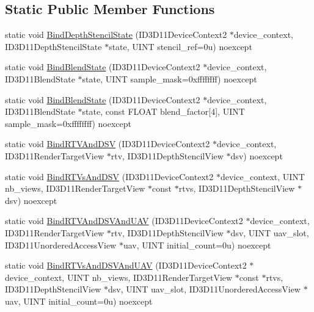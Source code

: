 \subsection*{Static Public Member Functions}
\begin{DoxyCompactItemize}
\item 
static void \hyperlink{structmage_1_1_o_m_a14f6a3fcf0678bf2092d443b06b3a925}{Bind\+Depth\+Stencil\+State} (I\+D3\+D11\+Device\+Context2 $\ast$device\+\_\+context, I\+D3\+D11\+Depth\+Stencil\+State $\ast$state, U\+I\+NT stencil\+\_\+ref=0u) noexcept
\item 
static void \hyperlink{structmage_1_1_o_m_aa0ab164522c95b983254718a17f8304e}{Bind\+Blend\+State} (I\+D3\+D11\+Device\+Context2 $\ast$device\+\_\+context, I\+D3\+D11\+Blend\+State $\ast$state, U\+I\+NT sample\+\_\+mask=0xffffffff) noexcept
\item 
static void \hyperlink{structmage_1_1_o_m_a1d28a8b67f3760107cfc4e8ae7fe78fa}{Bind\+Blend\+State} (I\+D3\+D11\+Device\+Context2 $\ast$device\+\_\+context, I\+D3\+D11\+Blend\+State $\ast$state, const F\+L\+O\+AT blend\+\_\+factor\mbox{[}4\mbox{]}, U\+I\+NT sample\+\_\+mask=0xffffffff) noexcept
\item 
static void \hyperlink{structmage_1_1_o_m_a6c031fe0e62dfee63463f05e3fb63f97}{Bind\+R\+T\+V\+And\+D\+SV} (I\+D3\+D11\+Device\+Context2 $\ast$device\+\_\+context, I\+D3\+D11\+Render\+Target\+View $\ast$rtv, I\+D3\+D11\+Depth\+Stencil\+View $\ast$dsv) noexcept
\item 
static void \hyperlink{structmage_1_1_o_m_ab296a9a3c4355437c8ef1008b2938112}{Bind\+R\+T\+Vs\+And\+D\+SV} (I\+D3\+D11\+Device\+Context2 $\ast$device\+\_\+context, U\+I\+NT nb\+\_\+views, I\+D3\+D11\+Render\+Target\+View $\ast$const $\ast$rtvs, I\+D3\+D11\+Depth\+Stencil\+View $\ast$dsv) noexcept
\item 
static void \hyperlink{structmage_1_1_o_m_af4d9441b3a8d905debeb46e6bdcdcd3f}{Bind\+R\+T\+V\+And\+D\+S\+V\+And\+U\+AV} (I\+D3\+D11\+Device\+Context2 $\ast$device\+\_\+context, I\+D3\+D11\+Render\+Target\+View $\ast$rtv, I\+D3\+D11\+Depth\+Stencil\+View $\ast$dsv, U\+I\+NT uav\+\_\+slot, I\+D3\+D11\+Unordered\+Access\+View $\ast$uav, U\+I\+NT initial\+\_\+count=0u) noexcept
\item 
static void \hyperlink{structmage_1_1_o_m_a0cacb7ef07da3ce8124901c3db58be33}{Bind\+R\+T\+Vs\+And\+D\+S\+V\+And\+U\+AV} (I\+D3\+D11\+Device\+Context2 $\ast$device\+\_\+context, U\+I\+NT nb\+\_\+views, I\+D3\+D11\+Render\+Target\+View $\ast$const $\ast$rtvs, I\+D3\+D11\+Depth\+Stencil\+View $\ast$dsv, U\+I\+NT uav\+\_\+slot, I\+D3\+D11\+Unordered\+Access\+View $\ast$uav, U\+I\+NT initial\+\_\+count=0u) noexcept

\end{DoxyCompactItemize}
